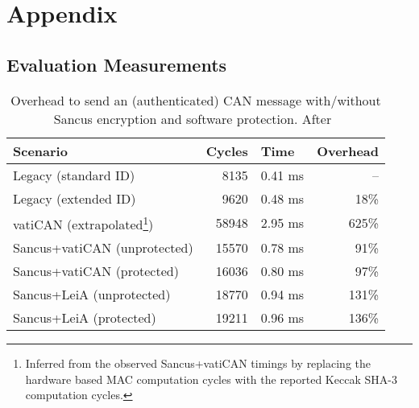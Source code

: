 
\newpage

\section*{Appendix}


\subsection{Evaluation Measurements}\label{app:evaluation_measurements}

\begin{table}[h]
    \centering
    \begin{tabular}{@{}lrrr@{}}
    \toprule
    \textbf{Scenario}            & \multicolumn{1}{l}{\textbf{Cycles}} & \multicolumn{1}{l}{\textbf{Time}} & \multicolumn{1}{l}{\textbf{Overhead}} \\ \midrule
    Legacy (standard ID)         & 8135                                & 0.41 ms                           & –                                     \\
    Legacy (extended ID)         & 9620                                & 0.48 ms                           & 18\%                                  \\
    vatiCAN (extrapolated\footnote{\label{footnote-label}Inferred from the observed Sancus+vatiCAN timings by replacing the hardware based MAC computation cycles with the reported Keccak \mbox{SHA-3} computation cycles.})      & 58948                               & 2.95 ms                           & 625\%                                 \\
    Sancus+vatiCAN (unprotected) & 15570                               & 0.78 ms                           & 91\%                                  \\
    Sancus+vatiCAN (protected)   & 16036                               & 0.80 ms                           & 97\%                                  \\
    Sancus+LeiA (unprotected)    & 18770                               & 0.94 ms                           & 131\%                                 \\
    Sancus+LeiA (protected)      & 19211                               & 0.96 ms                           & 136\%                                 \\ \bottomrule
    \end{tabular}
    \caption{Overhead to send an (authenticated) CAN message with/without Sancus encryption and software protection. After~\cite{VanBulck2017}}
\end{table}

